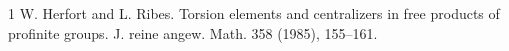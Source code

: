 \documentclass[11pt,a4paper]{article}
\begin{document}

\begin{thebibliography}{1}
 W. Herfort and L. Ribes. Torsion elements and centralizers in free products of profinite groups. J. reine angew. Math. 358 (1985), 155--161.
\end{thebibliography}
\end{document}

